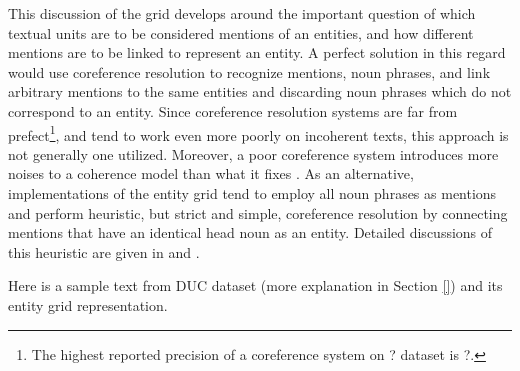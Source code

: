 This discussion of the grid develops around the important question of which textual units are to be considered mentions of an entities, and how different mentions are to be linked to represent an entity.
A perfect solution in this regard would use coreference resolution to recognize mentions, noun phrases, and link arbitrary mentions to the same entities and discarding noun phrases which do not correspond to an entity. 
Since coreference resolution systems are far from prefect\footnote{The highest reported precision of a coreference system on ? dataset is ?.}, and tend to work even more poorly on incoherent texts, this approach is not generally one utilized. 
Moreover, a poor coreference system introduces more noises to a coherence model than what it fixes \cite{barzilay05}.
As an alternative, implementations of the entity grid tend to employ all noun phrases as mentions and perform heuristic, but strict and simple, coreference resolution by connecting mentions that have an identical head noun as an entity. 
Detailed discussions of this heuristic are given in  and .

Here is a sample text from DUC dataset (more explanation in Section \ref{}) and its entity grid representation.


